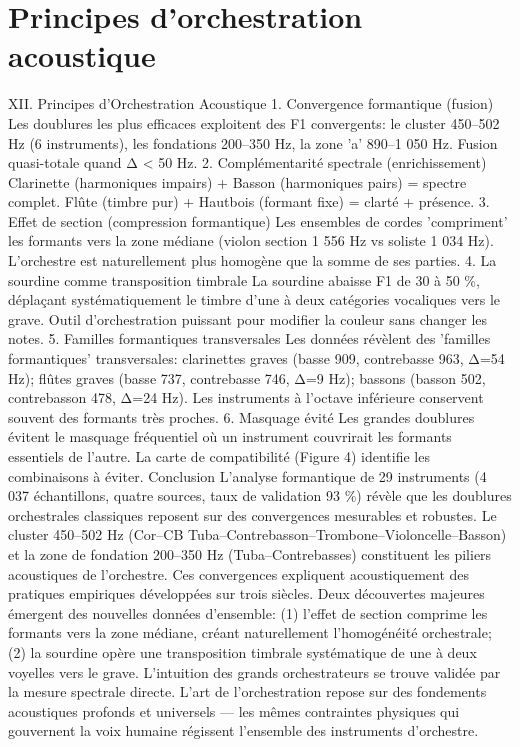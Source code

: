 \documentclass[11pt,a4paper]{article}
\begin{document}
\section{Principes d'orchestration acoustique}
XII. Principes d'Orchestration Acoustique 1. Convergence formantique (fusion) Les doublures les plus efficaces exploitent des F1 convergents: le cluster 450–502 Hz (6 instruments), les fondations 200–350 Hz, la zone 'a' 890–1 050 Hz. Fusion quasi-totale quand Δ < 50 Hz. 2. Complémentarité spectrale (enrichissement) Clarinette (harmoniques impairs) + Basson (harmoniques pairs) = spectre complet. Flûte (timbre pur) + Hautbois (formant fixe) = clarté + présence. 3. Effet de section (compression formantique) Les ensembles de cordes 'compriment' les formants vers la zone médiane (violon section 1 556 Hz vs soliste 1 034 Hz). L'orchestre est naturellement plus homogène que la somme de ses parties. 4. La sourdine comme transposition timbrale La sourdine abaisse F1 de 30 à 50 \%, déplaçant systématiquement le timbre d'une à deux catégories vocaliques vers le grave. Outil d'orchestration puissant pour modifier la couleur sans changer les notes. 5. Familles formantiques transversales Les données révèlent des 'familles formantiques' transversales: clarinettes graves (basse 909, contrebasse 963, Δ=54 Hz); flûtes graves (basse 737, contrebasse 746, Δ=9 Hz); bassons (basson 502, contrebasson 478, Δ=24 Hz). Les instruments à l'octave inférieure conservent souvent des formants très proches. 6. Masquage évité Les grandes doublures évitent le masquage fréquentiel où un instrument couvrirait les formants essentiels de l'autre. La carte de compatibilité (Figure 4) identifie les combinaisons à éviter. Conclusion L'analyse formantique de 29 instruments (4 037 échantillons, quatre sources, taux de validation 93 \%) révèle que les doublures orchestrales classiques reposent sur des convergences mesurables et robustes. Le cluster 450–502 Hz (Cor–CB Tuba–Contrebasson–Trombone–Violoncelle–Basson) et la zone de fondation 200–350 Hz (Tuba–Contrebasses) constituent les piliers acoustiques de l'orchestre. Ces convergences expliquent acoustiquement des pratiques empiriques développées sur trois siècles. Deux découvertes majeures émergent des nouvelles données d'ensemble: (1) l'effet de section comprime les formants vers la zone médiane, créant naturellement l'homogénéité orchestrale; (2) la sourdine opère une transposition timbrale systématique de une à deux voyelles vers le grave. L'intuition des grands orchestrateurs se trouve validée par la mesure spectrale directe. L'art de l'orchestration repose sur des fondements acoustiques profonds et universels — les mêmes contraintes physiques qui gouvernent la voix humaine régissent l'ensemble des instruments d'orchestre.
\par\medskip
\end{document}
